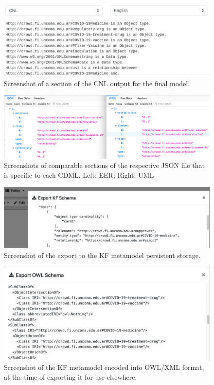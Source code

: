 \documentclass[sn-mathphys]{sn-jnl}
\begin{document}
\begin{figure}[h]
  \centering
      \includegraphics[width=1.0\textwidth]{covid19-cnl.pdf} 
    \caption{Screenshot of a section of the CNL output for the final model.}
    \label{fig:toCNL}
\end{figure}



\begin{figure}[h]
  \centering
      \includegraphics[width=1.0\textwidth]{covidER2andUML2export.pdf} 
    \caption{Screenshots of comparable sections of the respective JSON file that is specific to each CDML. Left: EER; Right: UML}
    \label{fig:jsonER2andUML2}
\end{figure}


\begin{figure}[h]
  \centering
      \includegraphics[width=1.0\textwidth]{covidexportKF.pdf} 
    \caption{Screenshot of the export to the KF metamodel persistent storage.}
    \label{fig:toKF}
\end{figure}


\begin{figure}[h]
  \centering
      \includegraphics[width=1.0\textwidth]{covidexporttoOWL.pdf} 
    \caption{Screenshot of the KF metamodel encoded into OWL/XML format, at the time of exporting it for use elsewhere.}
    \label{fig:toOWL}
\end{figure}
\end{document}
